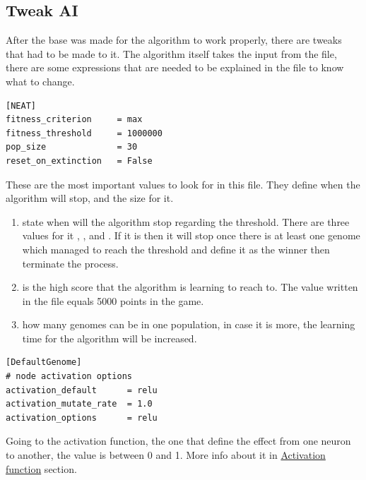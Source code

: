 \subsection{Tweak AI}\label{tweak-ai}

After the base was made for the algorithm to work properly, there are tweaks that had to be made to it. The algorithm itself takes the input from the  file, there are some expressions that are needed to be explained in the file to know what to change.

\begin{listing}[H]
\begin{verbatim}
[NEAT]
fitness_criterion     = max
fitness_threshold     = 1000000
pop_size              = 30
reset_on_extinction   = False
\end{verbatim}
\end{listing}

These are the most important values to look for in this file. They define when the algorithm will stop, and the size for it.

\begin{enumerate}
\item {} state when will the algorithm stop regarding the threshold. There are three values for it , , and . If it is  then it will stop once there is at least one genome which managed to reach the threshold and define it as the winner then terminate the process.

\item {} is the high score that the algorithm is learning to reach to. The value written in the file equals 5000 points in the game.

\item {} how many genomes can be in one population, in case it is more, the learning time for the algorithm will be increased.

\end{enumerate}

\begin{listing}[H]
\begin{verbatim}
[DefaultGenome]
# node activation options
activation_default      = relu
activation_mutate_rate  = 1.0
activation_options      = relu
\end{verbatim}
\end{listing}

Going to the activation function, the one that define the effect from one neuron to another, the value is between 0 and 1. More info about it in \hyperref[sec:activation-function]{Activation function} section.  



